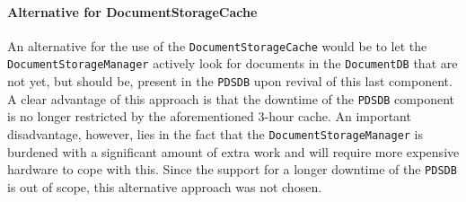 \documentclass[a4paper,10pt]{article}
\begin{document}
\paragraph{Alternative for DocumentStorageCache}
An alternative for the use of the \texttt{DocumentStorageCache} would be to let the \texttt{DocumentStorageManager} actively look for documents in the \texttt{DocumentDB} that are not yet, but should be, present in the \texttt{PDSDB} upon revival of this last component. A clear advantage of this approach is that the downtime of the \texttt{PDSDB} component is no longer restricted by the aforementioned 3-hour cache. An important disadvantage, however, lies in the fact that the \texttt{DocumentStorageManager} is burdened with a significant amount of extra work and will require more expensive hardware to cope with this. Since the support for a longer downtime of the \texttt{PDSDB} is out of scope, this alternative approach was not chosen.
\end{document}
